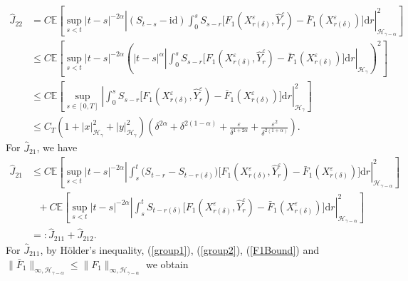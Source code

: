 \documentclass[10pt,a4paper]{article}
\numberwithin{equation}{section}
\begin{document}
\begin{align}\label{hatJ22}
	\hat{J}_{22}&=C \mathbb E \left[ \sup_{s<t} |t-s|^{-2\alpha} \left| (S_{t-s}-\mathrm{id}) \int_0^s S_{s-r} \big[ F_1(X_{r(\delta)}^\varepsilon,\hat{Y}_r^\varepsilon)-\bar{F}_1(X_{r(\delta)}^\varepsilon) \big] \mathrm{d} r \right|_{\mathcal H_{\gamma-\alpha} }^2 \right] \nonumber\\
	& \leq  C \mathbb E \left[ \sup_{s<t} |t-s|^{-2\alpha}  \left( |t-s|^\alpha \left| \int_0^s S_{s-r} \big[ F_1(X_{r(\delta)}^\varepsilon,\hat{Y}_r^\varepsilon)-\bar{F}_1(X_{r(\delta)}^\varepsilon) \big] \mathrm{d} r \right|_{\mathcal H_\gamma } \right)^2 \right] \nonumber\\
	&\leq  C \mathbb E \left[ \sup_{s \in [0,T]}  \left| \int_0^s S_{s-r} \big[ F_1(X_{r(\delta)}^\varepsilon,\hat{Y}_r^\varepsilon)-\bar{F}_1(X_{r(\delta)}^\varepsilon) \big] \mathrm{d} r \right|_{\mathcal H_\gamma }^2 \right] \nonumber\\
&\leq C_T(1+|x|_{\mathcal H_\gamma}^2+| y |_{\mathcal H_\gamma }^2) \left(\delta^{2\alpha}+\delta^{2(1-\alpha)}+\frac {\varepsilon} {\delta^{1+2\alpha}} +\frac {\varepsilon^2} {\delta^{2(1+\alpha)}}  \right).
\end{align}
For $\hat{J}_{21}$, we have
\begin{align*}
	\hat{J}_{21}
	&\leq C \mathbb E \left[ \sup_{s<t} |t-s|^{-2\alpha}
	\left| \int_s^t \big( S_{t-r}-S_{t-r(\delta)} \big) \big[F_1(X_{r(\delta)}^\varepsilon,\hat{Y}_r^\varepsilon)-\bar{F}_1(X_{r(\delta)}^\varepsilon) \big] \mathrm{d} r \right|_{\mathcal H_{\gamma-\alpha} }^2 \right] \nonumber\\
	&~~~+ C\mathbb E \left[ \sup_{s<t} |t-s|^{-2\alpha}
	\left| \int_s^t  S_{t-r(\delta)}  \big[F_1(X_{r(\delta)}^\varepsilon,\hat{Y}_r^\varepsilon)-\bar{F}_1(X_{r(\delta)}^\varepsilon) \big] \mathrm{d} r \right|_{\mathcal H_{\gamma-\alpha} }^2 \right] \nonumber\\
	&=: \hat{J}_{211}+\hat{J}_{212}.
\end{align*}
For $\hat{J}_{211}$, by H\"{o}lder's inequality, (\ref{group1}), (\ref{group2}), (\ref{F1Bound}) and $\|\bar{F}_1\|_{\infty,\mathcal H_{\gamma-\alpha}} \leq \|F_1\|_{\infty,\mathcal H_{\gamma-\alpha}}$ we obtain
\end{document}
